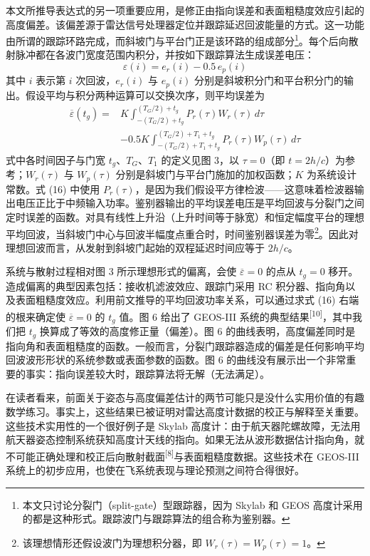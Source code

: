 本文所推导表达式的另一项重要应用，是修正由指向误差和表面粗糙度效应引起的高度偏差。该偏差源于雷达信号处理器定位并跟踪延迟回波能量的方式。这一功能由所谓的跟踪环路完成，而斜坡门与平台门正是该环路的组成部分\footnote{本文只讨论分裂门（split-gate）型跟踪器，因为 Skylab 和 GEOS 高度计采用的都是这种形式。跟踪波门与跟踪算法的组合称为鉴别器。}。每个后向散射脉冲都在各波门宽度范围内积分，并按如下跟踪算法生成误差电压：
\[
\varepsilon(i) = e_{r}(i) - 0.5\,e_{p}(i)
\tag{15}
\]
其中 $i$ 表示第 $i$ 次回波，$e_{r}(i)$ 与 $e_{p}(i)$ 分别是斜坡积分门和平台积分门的输出。假设平均与积分两种运算可以交换次序，则平均误差为
\[
\begin{aligned}
\overline{\varepsilon}(t_{g}) ={} & K\int_{-(T_{G}/2)+t_{g}}^{(T_{G}/2)+t_{g}} P_{r}(\tau)W_{r}(\tau)\,d\tau \\
& - 0.5K\int_{-(T_{G}/2)+T_{1}+t_{g}}^{(T_{G}/2)+T_{1}+t_{g}} P_{r}(\tau)W_{p}(\tau)\,d\tau
\end{aligned}
\tag{16}
\]
式中各时间因子与门宽 $t_{g}$、$T_{G}$、$T_{1}$ 的定义见图 3，以 $\tau = 0$（即 $t = 2h/c$）为参考；$W_{r}(\tau)$ 与 $W_{p}(\tau)$ 分别是斜坡门与平台门施加的加权函数；$K$ 为系统设计常数。式 (16) 中使用 $P_{r}(\tau)$，是因为我们假设平方律检波——这意味着检波器输出电压正比于中频输入功率。鉴别器输出的平均误差电压是平均回波与分裂门之间定时误差的函数。对具有线性上升沿（上升时间等于脉宽）和恒定幅度平台的理想平均回波，当斜坡门中心与回波半幅度点重合时，时间鉴别器误差为零\footnote{该理想情形还假设波门为理想积分器，即 $W_{r}(\tau) = W_{p}(\tau) = 1$。}。因此对理想回波而言，从发射到斜坡门起始的双程延迟时间应等于 $2h/c$。

系统与散射过程相对图 3 所示理想形式的偏离，会使 $\overline{\varepsilon} = 0$ 的点从 $t_{g} = 0$ 移开。造成偏离的典型因素包括：接收机滤波效应、跟踪门采用 RC 积分器、指向角以及表面粗糙度效应。利用前文推导的平均回波功率关系，可以通过求式 (16) 右端的根来确定使 $\overline{\varepsilon} = 0$ 的 $t_{g}$ 值。图 6 给出了 GEOS-III 系统的典型结果\textsuperscript{[10]}，其中我们把 $t_{g}$ 换算成了等效的高度修正量（偏差）。图 6 的曲线表明，高度偏差同时是指向角和表面粗糙度的函数。一般而言，分裂门跟踪器造成的偏差是任何影响平均回波波形形状的系统参数或表面参数的函数。图 6 的曲线没有展示出一个非常重要的事实：指向误差较大时，跟踪算法将无解（无法满足）。


在读者看来，前面关于姿态与高度偏差估计的两节可能只是没什么实用价值的有趣数学练习。事实上，这些结果已被证明对雷达高度计数据的校正与解释至关重要。这些技术实用性的一个很好例子是 Skylab 高度计：由于航天器陀螺故障，无法用航天器姿态控制系统获知高度计天线的指向。如果无法从波形数据估计指向角，就不可能正确处理和校正后向散射截面\textsuperscript{[8]}与表面粗糙度数据。这些技术在 GEOS-III 系统上的初步应用，也使在飞系统表现与理论预测之间符合得很好。

